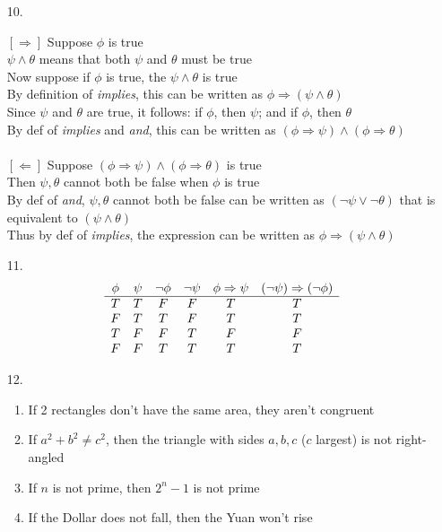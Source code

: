 \documentclass[11pt]{exam}
\begin{document}
\begin{enumerate}[leftmargin=0pt]
\item[10.]

$[\Rightarrow]$ Suppose $\phi$ is true \\
$\psi \land \theta$ means that both $\psi$ and $\theta$ must be true \\
Now suppose if $\phi$ is true, the $\psi \land \theta$ is true \\
By definition of \emph{implies}, this can be written as $\phi \Rightarrow (\psi \land \theta)$ \\
Since $\psi$ and $\theta$ are true, it follows: if $\phi$, then $\psi$; and if $\phi$, then $\theta$ \\
By def of \emph{implies} and \emph{and}, this can be written as $(\phi \Rightarrow \psi) \land (\phi \Rightarrow \theta)$ \\
\\
$[\Leftarrow]$ Suppose $(\phi \Rightarrow \psi) \land (\phi \Rightarrow \theta)$ is true \\
Then $\psi, \theta$ cannot both be false when $\phi$ is true \\
By def of \emph{and}, $\psi, \theta$ cannot both be false can be written as $(\neg \psi \lor \neg \theta)$ that is equivalent to $(\psi \land \theta)$ \\
Thus by def of \emph{implies}, the expression can be written as $\phi \Rightarrow (\psi \land \theta)$

\item[11.]
\begin{displaymath}
    \begin{array}{c c c c c c}
        \phi & \psi & \neg \phi & \neg \psi & \phi \Rightarrow \psi & (\neg \psi) \Rightarrow (\neg \phi) \\
        \hline
        T & T & F & F & T & T \\
        F & T & T & F & T & T \\
        T & F & F & T & F & F \\
        F & F & T & T & T & T
    \end{array}
\end{displaymath}

\item[12.]
\begin{enumerate}[label=(\alph*)]
    \item If 2 rectangles don't have the same area, they aren't congruent
    \item If $a^2 + b^2 \neq c^2$, then the triangle with sides $a, b, c$ ($c$ largest) is not right-angled
    \item If $n$ is not prime, then $2^n - 1$ is not prime
    \item If the Dollar does not fall, then the Yuan won't rise
\end{enumerate}


\end{enumerate}
\end{document}
